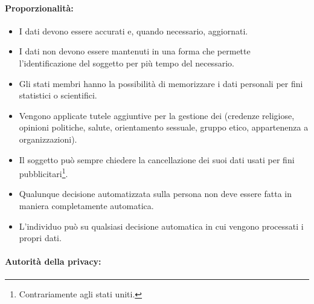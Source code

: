 \paragraph{Proporzionalità:}

\begin{itemize}
  \item I dati devono essere accurati e, quando necessario, aggiornati. 
  \item I dati non devono essere mantenuti in una forma che permette l'identificazione del soggetto per più tempo del necessario. 
  \item Gli stati membri hanno la possibilità di memorizzare i dati personali per fini statistici o scientifici. 
  \item Vengono applicate tutele aggiuntive per la gestione dei  (credenze religiose, opinioni politiche, salute, orientamento sessuale, gruppo etico, appartenenza a organizzazioni). 
  \item Il soggetto può sempre chiedere la cancellazione dei suoi dati usati per fini pubblicitari\footnote{Contrariamente agli stati uniti.}. 
  \item Qualunque decisione automatizzata sulla persona non deve essere fatta in maniera completamente automatica. 
  \item L'individuo può  su qualsiasi decisione automatica in cui vengono processati i propri dati.
\end{itemize}

\paragraph{Autorità della privacy:}

